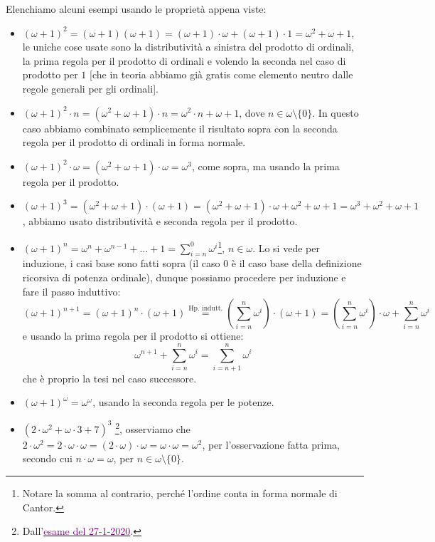 \begin{example}
	Elenchiamo alcuni esempi usando le propriet\`a appena viste:
	\begin{itemize}
		\item $(\omega + 1)^2 = (\omega + 1)(\omega + 1) = (\omega + 1)\cdot \omega + (\omega + 1) \cdot 1 = \omega^2 + \omega + 1$, le uniche cose usate sono la distributivit\`a a sinistra del prodotto di ordinali, la prima regola per il prodotto di ordinali e volendo la seconda nel caso di prodotto per $1$ [che in teoria abbiamo gi\`a gratis come elemento neutro dalle regole generali per gli ordinali].
		\item $(\omega + 1)^2 \cdot n = (\omega^2 + \omega + 1) \cdot n = \omega^2 \cdot n + \omega + 1$, dove $n \in \omega\setminus\{0\}$. In questo caso abbiamo combinato semplicemente il risultato sopra con la seconda regola per il prodotto di ordinali in forma normale.
		\item $(\omega + 1)^2 \cdot \omega = (\omega^2 + \omega + 1) \cdot \omega = \omega^3$, come sopra, ma usando la prima regola per il prodotto.
		\item $(\omega + 1)^3 = (\omega^2 + \omega + 1) \cdot (\omega + 1) = (\omega^2 + \omega + 1) \cdot \omega + \omega^2 + \omega + 1 = \omega^3 + \omega^2 + \omega + 1$, abbiamo usato distributivit\`a e seconda regola per il prodotto.
		\item $(\omega + 1)^n = \omega^n + \omega^{n - 1} + \ldots + 1 = \sum_{i = n}^0 \omega^i$\footnote{Notare la somma al contrario, perch\'e l'ordine conta in forma normale di Cantor.}, $n \in \omega$. Lo si vede per induzione, i casi base sono fatti sopra (il caso 0 \`e il caso base della definizione ricorsiva di potenza ordinale), dunque possiamo procedere per induzione e fare il passo induttivo:
		\[ (\omega + 1)^{n + 1} = (\omega + 1)^n \cdot (\omega + 1) \overset{\text{Hp. indutt.}}{=} \left(\sum_{i = n}^n \omega^i\right) \cdot (\omega + 1) = \left(\sum_{i = n}^n \omega^i\right) \cdot \omega + \sum_{i = n}^n \omega^i
			\]
		e usando la prima regola per il prodotto si ottiene:
		\[ \omega^{n + 1} + \sum_{i = n}^n \omega^i = \sum_{i = n + 1}^n \omega^i
			\]
		che \`e proprio la tesi nel caso successore.
		\item $(\omega + 1)^\omega = \omega^\omega$, usando la seconda regola per le potenze.
		\item $(2 \cdot \omega^2 + \omega \cdot 3 + 7)^3$ \footnote{Dall'\href{https://ciovil.li/eti20/exam05.pdf}{\textcolor{purple}{esame del 27-1-2020}}.}, osserviamo che $2 \cdot \omega^2 = 2 \cdot \omega \cdot \omega = (2 \cdot \omega) \cdot \omega = \omega \cdot \omega = \omega^2$, per l'osservazione fatta prima, secondo cui $n \cdot \omega = \omega$, per $n \in \omega\setminus\{0\}$.

\end{itemize}
\end{example}
